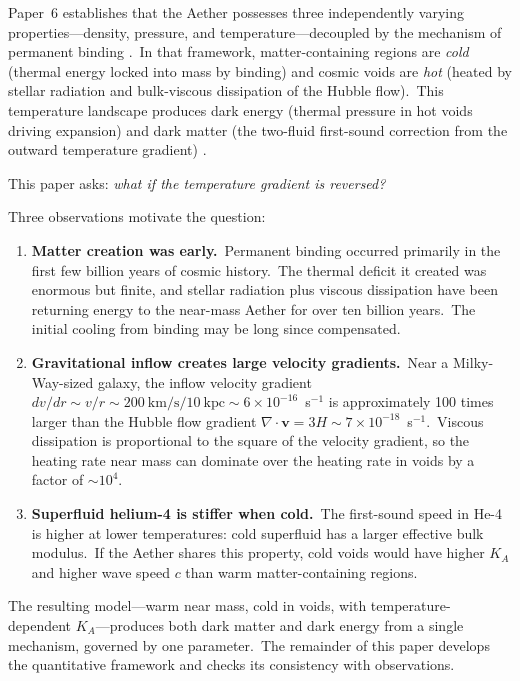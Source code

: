 \documentclass[12pt,letterpaper]{article}
\newcommand{\Ka}{K_{\!A}}
\begin{document}
Paper~6 establishes that the Aether possesses three independently varying
properties---density, pressure, and temperature---decoupled by the mechanism
of permanent binding \cite{otto-overview}.\ In that framework, matter-containing
regions are \emph{cold} (thermal energy locked into mass by binding) and
cosmic voids are \emph{hot} (heated by stellar radiation and bulk-viscous
dissipation of the Hubble flow).\ This temperature landscape produces dark
energy (thermal pressure in hot voids driving expansion) and dark matter
(the two-fluid first-sound correction from the outward temperature gradient)
\cite{otto-cosmology}.

This paper asks: \emph{what if the temperature gradient is reversed?}

Three observations motivate the question:

\begin{enumerate}[leftmargin=2em]
  \item \textbf{Matter creation was early.}\ Permanent binding occurred
    primarily in the first few billion years of cosmic history.\ The thermal
    deficit it created was enormous but finite, and stellar radiation plus
    viscous dissipation have been returning energy to the near-mass Aether
    for over ten billion years.\ The initial cooling from binding may be
    long since compensated.

  \item \textbf{Gravitational inflow creates large velocity gradients.}\
    Near a Milky-Way-sized galaxy, the inflow velocity gradient
    $dv/dr \sim v/r \sim 200~\text{km/s} / 10~\text{kpc} \sim 6 \times
    10^{-16}$~s$^{-1}$ is approximately 100 times larger than the Hubble
    flow gradient $\nabla \cdot \mathbf{v} = 3H \sim 7 \times
    10^{-18}$~s$^{-1}$.\ Viscous dissipation is proportional to the square
    of the velocity gradient, so the heating rate near mass can dominate
    over the heating rate in voids by a factor of $\sim$$10^4$.

  \item \textbf{Superfluid helium-4 is stiffer when cold.}\ The first-sound
    speed in He-4 is higher at lower temperatures: cold superfluid has a
    larger effective bulk modulus.\ If the Aether shares this property, cold
    voids would have higher $\Ka$ and higher wave speed $c$ than warm
    matter-containing regions.
\end{enumerate}

The resulting model---warm near mass, cold in voids, with
temperature-dependent $\Ka$---produces both dark matter and dark energy
from a single mechanism, governed by one parameter.\ The remainder of this
paper develops the quantitative framework and checks its consistency with
observations.
\end{document}
